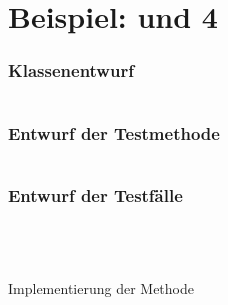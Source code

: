 \section{Beispiel:  und 4\grqq}

\begin{frame}[fragile]
  \frametitle{Klassenentwurf}
  \inputminted[fontsize=\footnotesize]{java}{src/playRoundManage1.java}
\end{frame}

\begin{frame}[fragile]
  \frametitle{Entwurf der Testmethode}
  \inputminted[fontsize=\small]{java}{src/playRoundEmpty.java}
\end{frame}

\begin{frame}[fragile]
  \frametitle{Entwurf der Testfälle}
  \inputminted[fontsize=\footnotesize]{java}{src/playRoundManage1.java}
\end{frame}

\begin{frame}[fragile]
  \inputminted[fontsize=\small]{java}{src/playRoundTakesTurns.java}
\end{frame}

\begin{frame}[fragile]
  \inputminted[fontsize=\footnotesize]{java}{src/playRoundSortsPlayersByScore.java}
\end{frame}

\begin{frame}[fragile]
  \inputminted[fontsize=\footnotesize]{java}{src/playRoundGivesResult.java}
\end{frame}

\begin{frame}[fragile]{Implementierung der Methode}
  \inputminted[fontsize=\footnotesize]{java}{src/playRound.java}
\end{frame}
